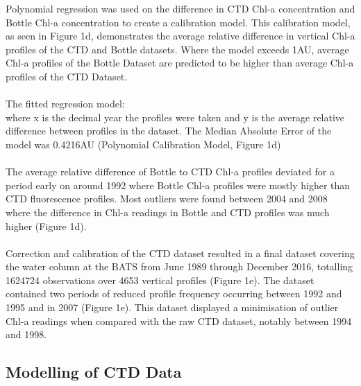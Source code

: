 \documentclass{article}
\begin{document}
Polynomial regression was used on the difference in CTD Chl-a concentration and Bottle Chl-a concentration to create a calibration model. This calibration model, as seen in Figure 1d, demonstrates the average relative difference in vertical Chl-a profiles of the CTD and Bottle datasets. Where the model exceeds 1AU, average Chl-a profiles of the Bottle Dataset are predicted to be higher than average Chl-a profiles of the CTD Dataset. \\ \\
\noindent
The fitted regression model:  \\
where x is the decimal year the profiles were taken and y is the average relative difference between profiles in the dataset. The Median Absolute Error of the model was 0.4216AU (Polynomial Calibration Model, Figure 1d) \\ \\
The average relative difference of Bottle to CTD Chl-a profiles deviated for a period early on around 1992 where Bottle Chl-a profiles were mostly higher than CTD fluorescence profiles. Most outliers were found between 2004 and 2008 where the difference in Chl-a readings in Bottle and CTD profiles was much higher (Figure 1d). \\ \\
Correction and calibration of the CTD dataset resulted in a final dataset covering the water column at the BATS from June 1989 through December 2016, totalling 1624724 observations over 4653 vertical profiles (Figure 1e). The dataset contained two periods of reduced profile frequency occurring between 1992 and 1995 and in 2007 (Figure 1e). This dataset displayed a minimisation of outlier Chl-a readings when compared with the raw CTD dataset, notably between 1994 and 1998.
\subsection{Modelling of CTD Data}
\end{document}
